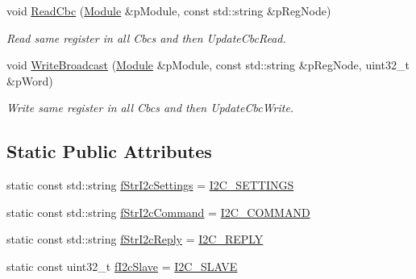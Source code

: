 \begin{DoxyCompactItemize}
void \hyperlink{class_ph2___hw_interface_1_1_cbc_interface_a46314c37156baa31c484c1141218bb49}{Read\-Cbc} (\hyperlink{class_ph2___hw_description_1_1_module}{Module} \&p\-Module, const std\-::string \&p\-Reg\-Node)
\begin{DoxyCompactList}\small\item\em Read same register in all Cbcs and then Update\-Cbc\-Read. \end{DoxyCompactList}\item 
void \hyperlink{class_ph2___hw_interface_1_1_cbc_interface_a2aa83fb17f550cd65d32a07960a158ab}{Write\-Broadcast} (\hyperlink{class_ph2___hw_description_1_1_module}{Module} \&p\-Module, const std\-::string \&p\-Reg\-Node, uint32\-\_\-t \&p\-Word)
\begin{DoxyCompactList}\small\item\em Write same register in all Cbcs and then Update\-Cbc\-Write. \end{DoxyCompactList}\end{DoxyCompactItemize}
\subsection*{Static Public Attributes}
\begin{DoxyCompactItemize}
\item 
static const std\-::string \hyperlink{class_ph2___hw_interface_1_1_cbc_interface_ab45dcb5563c94075ac0a3e17d17c1fd4}{f\-Str\-I2c\-Settings} = \hyperlink{_definition_8h_a15db09e24617ea5c5843213672ac8a03}{I2\-C\-\_\-\-S\-E\-T\-T\-I\-N\-G\-S}
\item 
static const std\-::string \hyperlink{class_ph2___hw_interface_1_1_cbc_interface_a350e32baca2a50220eeff24b9fa07054}{f\-Str\-I2c\-Command} = \hyperlink{_definition_8h_ae308275dafb538f2511ea285fea768d0}{I2\-C\-\_\-\-C\-O\-M\-M\-A\-N\-D}
\item 
static const std\-::string \hyperlink{class_ph2___hw_interface_1_1_cbc_interface_a6a0730099e121a7707615ba6969afe80}{f\-Str\-I2c\-Reply} = \hyperlink{_definition_8h_a46aaa2293185dfc3cd655f65bea7f614}{I2\-C\-\_\-\-R\-E\-P\-L\-Y}
\item 
static const uint32\-\_\-t \hyperlink{class_ph2___hw_interface_1_1_cbc_interface_ad5257bb9fac0efe9cb8307a04f51ef77}{f\-I2c\-Slave} = \hyperlink{_definition_8h_ab15137f7c592d05573de99f078516157}{I2\-C\-\_\-\-S\-L\-A\-V\-E}
\end{DoxyCompactItemize}
